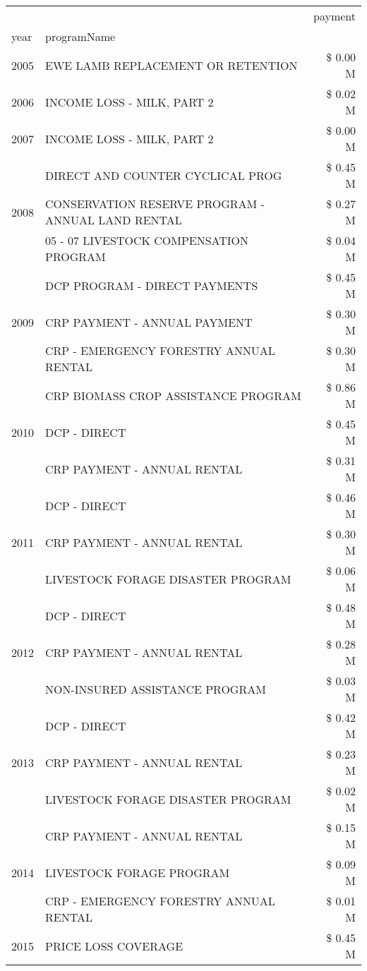 \begin{tabular}{llr}
\toprule
 &  & payment \\
year & programName &  \\
\midrule
2005 & EWE LAMB REPLACEMENT OR RETENTION & \$ 0.00 M \\
\cline{1-3}
2006 & INCOME LOSS - MILK, PART 2 & \$ 0.02 M \\
\cline{1-3}
2007 & INCOME LOSS - MILK, PART 2 & \$ 0.00 M \\
\cline{1-3}
\multirow[t]{3}{*}{2008} & DIRECT AND COUNTER CYCLICAL PROG & \$ 0.45 M \\
 & CONSERVATION RESERVE PROGRAM - ANNUAL LAND RENTAL & \$ 0.27 M \\
 & 05 - 07 LIVESTOCK COMPENSATION PROGRAM & \$ 0.04 M \\
\cline{1-3}
\multirow[t]{3}{*}{2009} & DCP PROGRAM - DIRECT PAYMENTS & \$ 0.45 M \\
 & CRP PAYMENT - ANNUAL PAYMENT & \$ 0.30 M \\
 & CRP - EMERGENCY FORESTRY ANNUAL RENTAL & \$ 0.30 M \\
\cline{1-3}
\multirow[t]{3}{*}{2010} & CRP BIOMASS CROP ASSISTANCE PROGRAM & \$ 0.86 M \\
 & DCP - DIRECT & \$ 0.45 M \\
 & CRP PAYMENT - ANNUAL RENTAL & \$ 0.31 M \\
\cline{1-3}
\multirow[t]{3}{*}{2011} & DCP - DIRECT & \$ 0.46 M \\
 & CRP PAYMENT - ANNUAL RENTAL & \$ 0.30 M \\
 & LIVESTOCK FORAGE DISASTER PROGRAM & \$ 0.06 M \\
\cline{1-3}
\multirow[t]{3}{*}{2012} & DCP - DIRECT & \$ 0.48 M \\
 & CRP PAYMENT - ANNUAL RENTAL & \$ 0.28 M \\
 & NON-INSURED ASSISTANCE PROGRAM & \$ 0.03 M \\
\cline{1-3}
\multirow[t]{3}{*}{2013} & DCP - DIRECT & \$ 0.42 M \\
 & CRP PAYMENT - ANNUAL RENTAL & \$ 0.23 M \\
 & LIVESTOCK FORAGE DISASTER PROGRAM & \$ 0.02 M \\
\cline{1-3}
\multirow[t]{3}{*}{2014} & CRP PAYMENT - ANNUAL RENTAL & \$ 0.15 M \\
 & LIVESTOCK FORAGE PROGRAM & \$ 0.09 M \\
 & CRP - EMERGENCY FORESTRY ANNUAL RENTAL & \$ 0.01 M \\
\cline{1-3}
\multirow[t]{3}{*}{2015} & PRICE LOSS COVERAGE & \$ 0.45 M \\

\end{tabular}
